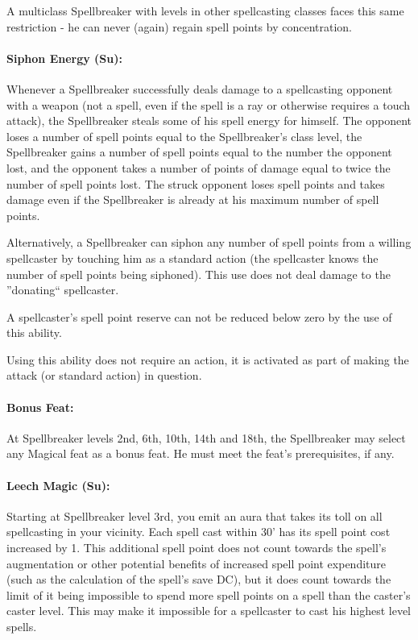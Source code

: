 A multiclass Spellbreaker with levels in other spellcasting classes faces this same restriction - he can never (again) regain spell points by concentration.
\paragraph{Siphon Energy (Su):} Whenever a Spellbreaker successfully deals damage to a spellcasting opponent with a weapon (not a spell, even if the spell is a ray or otherwise requires a touch attack), the Spellbreaker steals some of his spell energy for himself. The opponent loses a number of spell points equal to the Spellbreaker's class level, the Spellbreaker gains a number of spell points equal to the number the opponent lost, and the opponent takes a number of points of damage equal to twice the number of spell points lost. The struck opponent loses spell points and takes damage even if the Spellbreaker is already at his maximum number of spell points.

Alternatively, a Spellbreaker can siphon any number of spell points from a willing spellcaster by touching him as a standard action (the spellcaster knows the number of spell points being siphoned). This use does not deal damage to the ''donating`` spellcaster.

A spellcaster's spell point reserve can not be reduced below zero by the use of this ability.

Using this ability does not require an action, it is activated as part of making the attack (or standard action) in question.
\paragraph{Bonus Feat:} 
At Spellbreaker levels 2nd, 6th, 10th, 14th and 18th, the Spellbreaker may select any Magical feat as a bonus feat. He must meet the feat's prerequisites, if any.
\paragraph{Leech Magic (Su):} Starting at Spellbreaker level 3rd, you emit an aura that takes its toll on all spellcasting in your vicinity. Each spell cast within 30' has its spell point cost increased by 1. This additional spell point does not count towards the spell's augmentation or other potential benefits of increased spell point expenditure (such as the calculation of the spell's save DC), but it does count towards the limit of it being impossible to spend more spell points on a spell than the caster's caster level. This may make it impossible for a spellcaster to cast his highest level spells.

